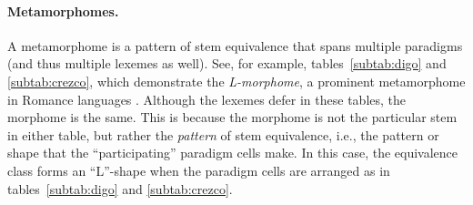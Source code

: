\paragraph{Metamorphomes.} A metamorphome is a pattern of stem 
equivalence that spans multiple paradigms 
(and thus multiple lexemes as well). See, for example, tables~\ref{subtab:digo}
and \ref{subtab:crezco}, which demonstrate the \emph{L-morphome}, a prominent 
metamorphome in Romance languages \citep{maiden:2005}. Although the 
lexemes defer in these tables, the morphome is the same. This is because 
the morphome is not the particular stem in either table, but rather the 
\emph{pattern} of stem equivalence, i.e., the pattern or shape that the ``participating'' paradigm cells make.
In this case, the equivalence class 
forms  an ``L''-shape when the paradigm cells are arranged as in tables~\ref{subtab:digo} 
and \ref{subtab:crezco}.
\begin{table}[t]\label{tab:l-morphome}
 \setlength{\extrarowheight}{6pt}
\centering %
\vspace{7pt}
\caption{The stem \textit{crezc-} `say' is an L-morphome in Spanish.}
\end{table}

